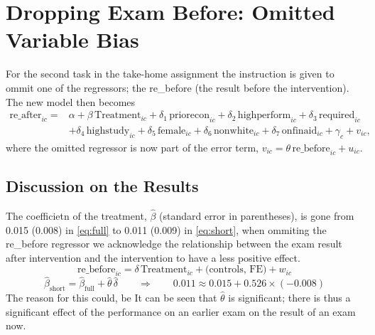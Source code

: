 \documentclass[12pt]{article}
\begin{document}
\section{Dropping Exam Before: Omitted Variable Bias}

For the second task in the take-home assignment the instruction is given to ommit one of the regressors; the re\_before (the result before the intervention). The new model then becomes
\begin{equation}
\begin{aligned}
\text{re\_after}_{ic} = {} & \alpha + \beta\,\text{Treatment}_{ic} + \delta_1\,\text{priorecon}_{ic} + \delta_2\,\text{highperform}_{ic} + \delta_3\,\text{required}_{ic} \\
& + \delta_4\,\text{highstudy}_{ic} + \delta_5\,\text{female}_{ic} + \delta_6\,\text{nonwhite}_{ic} + \delta_7\,\text{onfinaid}_{ic} + \gamma_c + v_{ic},
\end{aligned}
\label{eq:short}
\end{equation}
where the omitted regressor is now part of the error term, $v_{ic} = \theta\,\text{re\_before}_{ic} + u_{ic}$.

\subsection{Discussion on the Results}

The coefficietn of the treatment, $\hat{\beta}$ (standard error in parentheses), is gone from 0.015 (0.008) in \cref{eq:full} to 0.011 (0.009) in \cref{eq:short}, when ommiting the re\_before regressor we acknowledge the relationship between the exam result after intervention and the intervention to have a less positive effect. \\
\begin{equation}
\text{re\_before}_{ic} = \delta\,\text{Treatment}_{ic} + \text{(controls, FE)} + w_{ic}
\label{eq:aux}
\end{equation}
\begin{equation}
\hat{\beta}_{\text{short}} = \hat{\beta}_{\text{full}} + \hat{\theta}\,\hat{\delta}
\qquad\Rightarrow\qquad
0.011 \approx 0.015 + 0.526 \times (-0.008)
\label{eq:ovb}
\end{equation}
\newline
The reason for this could, be %
It can be seen that $\hat{\theta}$ is significant; there is thus a significant effect of the performance on an earlier exam on the result of an exam now.  
\end{document}

